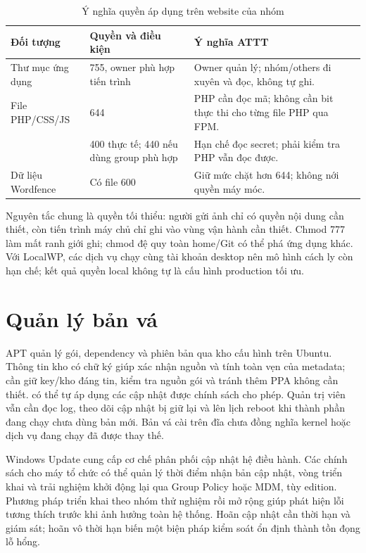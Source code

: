 \begin{table}[H]\centering\small
\caption{Ý nghĩa quyền áp dụng trên website của nhóm}
\begin{tabularx}{\linewidth}{lYY}\toprule Đối tượng & Quyền và điều kiện & Ý nghĩa ATTT\\\midrule
Thư mục ứng dụng & 755, owner phù hợp tiến trình & Owner quản lý; nhóm/others đi xuyên và đọc, không tự ghi.\\
File PHP/CSS/JS & 644 & PHP cần đọc mã; không cần bit thực thi cho từng file PHP qua FPM.\\
 & 400 thực tế; 440 nếu dùng group phù hợp & Hạn chế đọc secret; phải kiểm tra PHP vẫn đọc được.\\
Dữ liệu Wordfence & Có file 600 & Giữ mức chặt hơn 644; không nới quyền máy móc.\\\bottomrule\end{tabularx}\label{tab:permissions}
\end{table}
Nguyên tắc chung là quyền tối thiểu: người gửi ảnh chỉ có quyền nội dung cần thiết, còn tiến trình máy chủ chỉ ghi vào vùng vận hành cần thiết. Chmod 777 làm mất ranh giới ghi; chmod đệ quy toàn home/Git có thể phá ứng dụng khác. Với LocalWP, các dịch vụ chạy cùng tài khoản desktop nên mô hình cách ly còn hạn chế; kết quả quyền local không tự là cấu hình production tối ưu.

\section{Quản lý bản vá}
APT quản lý gói, dependency và phiên bản qua kho cấu hình trên Ubuntu. Thông tin kho có chữ ký giúp xác nhận nguồn và tính toàn vẹn của metadata; cần giữ key/kho đáng tin, kiểm tra nguồn gói và tránh thêm PPA không cần thiết.  có thể tự áp dụng các cập nhật được chính sách cho phép. Quản trị viên vẫn cần đọc log, theo dõi cập nhật bị giữ lại và lên lịch reboot khi thành phần đang chạy chưa dùng bản mới. Bản vá cài trên đĩa chưa đồng nghĩa kernel hoặc dịch vụ đang chạy đã được thay thế.\cite{ubuntuUpdates}

Windows Update cung cấp cơ chế phân phối cập nhật hệ điều hành. Các chính sách cho máy tổ chức có thể quản lý thời điểm nhận bản cập nhật, vòng triển khai và trải nghiệm khởi động lại qua Group Policy hoặc MDM, tùy edition. Phương pháp triển khai theo nhóm thử nghiệm rồi mở rộng giúp phát hiện lỗi tương thích trước khi ảnh hưởng toàn hệ thống. Hoãn cập nhật cần thời hạn và giám sát; hoãn vô thời hạn biến một biện pháp kiểm soát ổn định thành tồn đọng lỗ hổng.\cite{windowsUpdates}

